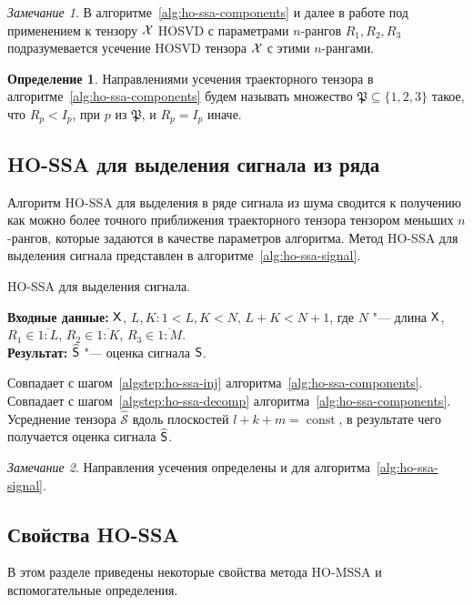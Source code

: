 \documentclass[specialist,
  substylefile=spbu_report.rtx,
subf,href,colorlinks=true, 12pt]{disser}
\theoremstyle{plain}
\theoremstyle{definition}
\newtheorem{definition}{Определение}[section]
\theoremstyle{remark}
\newtheorem{remark}{Замечание}[section]
\newcommand{\Input}{\textbf{Входные данные: }}
\newcommand{\Output}{\textbf{Результат: }}
\begin{document}
\begin{remark}
  В алгоритме~\ref{alg:ho-ssa-components} и далее в работе под
  применением к тензору $\mathcal{X}$ HOSVD с параметрами $n$-рангов $R_1,
  R_2, R_3$ подразумевается усечение HOSVD тензора $\mathcal{X}$ с этими
  $n$-рангами.
\end{remark}

\begin{definition}
  Направлениями усечения траекторного тензора в
  алгоритме~\ref{alg:ho-ssa-components}
  будем называть множество $\mathfrak{P}\subseteq \{1, 2, 3\}$ такое, что
  $R_p < I_p$, при $p$ из $\mathfrak{P}$, и $R_p = I_p$ иначе.
\end{definition}

\subsection{HO-SSA для выделения сигнала из ряда}\label{subsec:ho-ssa-signal}
Алгоритм HO-SSA для выделения в ряде сигнала из шума сводится к получению
как можно более точного приближения траекторного тензора тензором
меньших $n$-рангов, которые задаются в качестве параметров алгоритма.
Метод HO-SSA для выделения сигнала представлен в
алгоритме~\ref{alg:ho-ssa-signal}.
\begin{algorithm}[!ht]
  \caption{HO-SSA для выделения сигнала.}
  \label{alg:ho-ssa-signal}
  \Input $\mathsf{X}$, $L,K: 1< L,K < N,\, L + K < N + 1$, где $N$ "---
  длина $\mathsf{X}$, $R_1 \in \overline{1:L}$,
  $R_2 \in \overline{1:K}$, $R_3 \in \overline{1:M}$.\\
  \Output $\widehat{\mathsf{S}}$ "--- оценка сигнала $\mathsf{S}$.

  \begin{algorithmic}[1]
    \State Совпадает с шагом~\ref{algstep:ho-ssa-inj}
    алгоритма~\ref{alg:ho-ssa-components}.
    \State Совпадает с шагом~\ref{algstep:ho-ssa-decomp}
    алгоритма~\ref{alg:ho-ssa-components}.
    \State
    Усреднение тензора $\widehat{\mathcal{S}}$ вдоль плоскостей
    $l+k+m=\operatorname{const}$,
    в результате чего получается оценка сигнала $\widehat{\mathsf{S}}$.
  \end{algorithmic}
\end{algorithm}

\begin{remark}
  Направления усечения определены и для алгоритма~\ref{alg:ho-ssa-signal}.
\end{remark}

\subsection{Свойства HO-SSA}
В этом разделе приведены некоторые свойства метода HO-MSSA и
вспомогательные определения.
\end{document}

